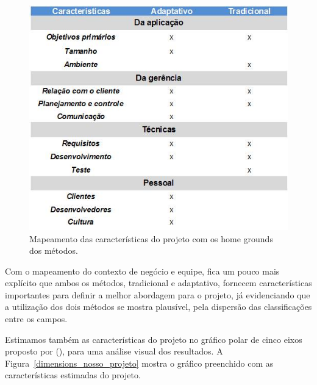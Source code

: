     \begin{figure}[!htbp]
      \centering
      \includegraphics[scale=0.5]{editaveis/figuras/tabela_homegrounds_Nosso_contexto}
      \caption[Mapeamento das características do projeto com os home grounds dos métodos]
	{Mapeamento das características do projeto com os home grounds dos métodos.}
      \label{homegrounds_nosso_projeto}
    \end{figure}
    
    Com o mapeamento do contexto de negócio e equipe, fica um pouco mais explícito que ambos os métodos, tradicional
    e adaptativo, fornecem características importantes para definir a melhor abordagem para o projeto, já evidenciando
    que a utilização dos dois métodos se mostra plausível, pela dispersão das classificações entre os campos.
    
    Estimamos também as características do projeto no gráfico polar de cinco eixos proposto por \citeauthor{boehm} (\citeyear{boehm}),
    para uma análise visual dos resultados. A Figura~\ref{dimensions_nosso_projeto} mostra o gráfico preenchido com as
    características estimadas do projeto.
    
